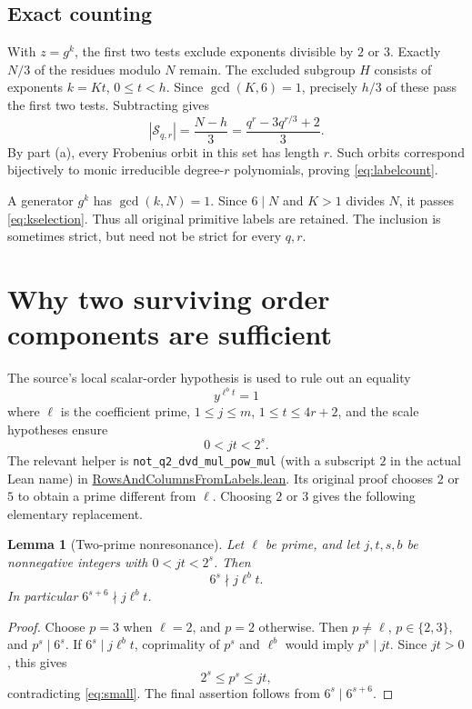 \documentclass[11pt,a4paper]{article}
\newtheorem{lemma}[theorem]{Lemma}
\theoremstyle{definition}
\theoremstyle{remark}
\newcommand{\good}{\mathcal S}
\newcommand{\code}[1]{{\small\nolinkurl{#1}}}
\newcommand{\src}[2]{\href{https://github.com/VladimirReshetnikov/ProveIt/blob/89d12dd40424f1217fd818d84877b3da52396a3b/Analysis/GeneralizedRiemannHypothesis/Lean/grh/src/#1.lean}{#2}}
\begin{document}
\subsection{Exact counting}

With \(z=g^k\), the first two tests exclude exponents divisible by \(2\) or \(3\).
Exactly \(N/3\) of the residues modulo \(N\) remain. The excluded subgroup \(H\)
consists of exponents \(k=Kt\), \(0\le t<h\).
Since \(\gcd(K,6)=1\), precisely \(h/3\) of these pass the first two tests.
Subtracting gives
\[
       |\good_{q,r}|=\frac{N-h}{3}
       =\frac{q^r-3q^{r/3}+2}{3}.
\]
By part (a), every Frobenius orbit in this set has length \(r\). Such orbits
correspond bijectively to monic irreducible degree-\(r\) polynomials, proving
\eqref{eq:labelcount}.

A generator \(g^k\) has \(\gcd(k,N)=1\). Since \(6\mid N\) and \(K>1\)
divides \(N\), it passes \eqref{eq:kselection}. Thus all original primitive labels
are retained. The inclusion is sometimes strict, but need not be strict for
every \(q,r\).

\section{Why two surviving order components are sufficient}
\label{sec:order}

The source's local scalar-order hypothesis is used to rule out an equality
\[
                       y^{\ell^b t}=1
\]
where \(\ell\) is the coefficient prime, \(1\le j\le m\),
\(1\le t\le4r+2\), and the scale hypotheses ensure
\begin{equation}
                         0<jt<2^s .
                         \label{eq:small}
\end{equation}
The relevant helper is \code{not_q2_dvd_mul_pow_mul} (with a subscript \(2\)
in the actual Lean name) in
\src{New/Congruences/GaloisRepresentations/RowsAndColumnsFromLabels}{RowsAndColumnsFromLabels.lean}.
Its original proof chooses \(2\) or \(5\) to obtain a prime different from \(\ell\).
Choosing \(2\) or \(3\) gives the following elementary replacement.

\begin{lemma}[Two-prime nonresonance]
\label{lem:nonresonance}
Let \(\ell\) be prime, and let \(j,t,s,b\) be nonnegative integers with
\(0<jt<2^s\). Then
\[
                     6^s\nmid j\ell^b t.
\]
In particular \(6^{s+6}\nmid j\ell^b t\).
\end{lemma}

\begin{proof}
Choose \(p=3\) when \(\ell=2\), and \(p=2\) otherwise. Then \(p\ne\ell\),
\(p\in\{2,3\}\), and \(p^s\mid6^s\).
If \(6^s\mid j\ell^b t\), coprimality of \(p^s\) and \(\ell^b\) would imply
\(p^s\mid jt\). Since \(jt>0\), this gives
\[
                     2^s\le p^s\le jt,
\]
contradicting \eqref{eq:small}. The final assertion follows from
\(6^s\mid6^{s+6}\).
\end{proof}
\end{document}
